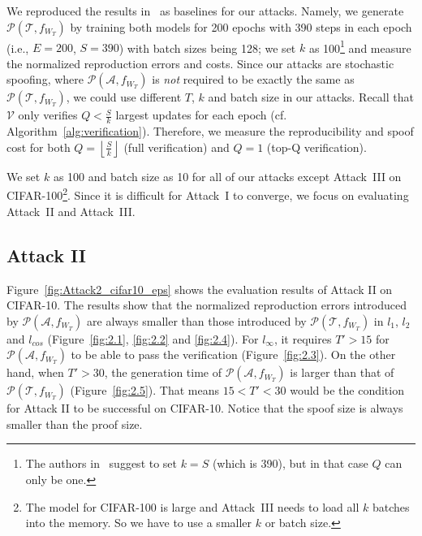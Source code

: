 \documentclass[conference]{IEEEtran}
\newcommand{\Prov}{\mathcal{T}\xspace}
\newcommand{\Verif}{\mathcal{V}\xspace}
\newcommand{\Adv}{\mathcal{A}\xspace}
\newcommand{\Proof}{\mathcal{P}\xspace}
\newcommand{\fig}{\textrm{Figure}\xspace}
\begin{document}
We reproduced the results in~\cite{PoL} as baselines for our attacks. 
Namely, we generate $\Proof(\Prov, f_{W_T})$ by training both models for 200 epochs with 390 steps in each epoch (i.e., $E=200$, $S=390$) with batch {sizes\EndAccSupp{}} being 128;
we set $k$ as 100\footnote{The authors in~\cite{PoL} suggest to set $k=S$ (which is 390), but in that case $Q$ can only be one.} and measure the normalized {reproduction\EndAccSupp{}} errors and costs.
Since our attacks are stochastic spoofing, where $\Proof(\Adv, f_{W_T})$ is {\em not} required to be exactly the same as $\Proof(\Prov, f_{W_T})$, we could use different $T$, $k$ and batch size in our attacks.
Recall that $\Verif$ only verifies $Q < \frac{S}{k}$ largest updates for each epoch (cf. Algorithm~\ref{alg:verification}).
Therefore, we measure the reproducibility and {spoof\EndAccSupp{}} cost for both $Q = \left\lfloor \frac{S}{k}  \right\rfloor$ (full verification) and $Q=1$ (top-Q verification).

We set $k$ as 100 and batch size as 10 for all of our attacks except Attack~III on CIFAR-100\footnote{The model for CIFAR-100 is large and Attack~III needs to load all $k$ batches into the memory. So we have to use a smaller $k$ or batch size.}.
Since it is difficult for Attack~I to converge, we focus on evaluating Attack~II and Attack~III.













\subsection{Attack II}




\fig~\ref{fig:Attack2_cifar10_eps} shows the evaluation results of Attack II on CIFAR-10. 
The results show that the normalized {reproduction\EndAccSupp{}} errors introduced by $\Proof(\Adv, f_{W_T})$ are always smaller than those introduced by $\Proof(\Prov, f_{W_T})$ in $l_1$, $l_2$ and $l_{cos}$ (\fig~\ref{fig:2.1}, \ref{fig:2.2} and \ref{fig:2.4}).
For $l_{\infty}$, it requires $T'>15$ for $\Proof(\Adv, f_{W_T})$ to be able to pass the verification  (\fig~\ref{fig:2.3}).
On the other hand, when $T'>30$, the generation time of $\Proof(\Adv, f_{W_T})$ is {larger\EndAccSupp{}} than that of $\Proof(\Prov, f_{W_T})$ (\fig~\ref{fig:2.5}).
That {means\EndAccSupp{}} $15<T'<30$ would be the condition for Attack II to be successful on CIFAR-10.
Notice that the {spoof\EndAccSupp{}} size is always smaller than the proof size.
\end{document}
